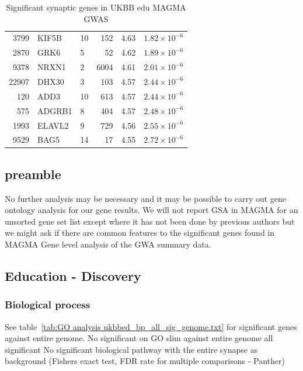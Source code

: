 \begin{table}[ht]
\begin{tabular}{rllrrr}
  3799 & KIF5B & 10 & 152 & 4.63 & $1.82 \times 10^{-6}$ \\ 
  2870 & GRK6 & 5 &  52 & 4.62 & $1.89 \times 10^{-6}$ \\ 
  9378 & NRXN1 & 2 & 6004 & 4.61 & $2.01 \times 10^{-6}$ \\ 
  22907 & DHX30 & 3 & 103 & 4.57 & $2.44 \times 10^{-6}$ \\ 
  120 & ADD3 & 10 & 613 & 4.57 & $2.44 \times 10^{-6}$ \\ 
  575 & ADGRB1 & 8 & 404 & 4.57 & $2.48 \times 10^{-6}$ \\ 
  1993 & ELAVL2 & 9 & 729 & 4.56 & $2.55 \times 10^{-6}$ \\ 
  9529 & BAG5 & 14 &  17 & 4.55 & $2.72 \times 10^{-6}$ \\ 
   \hline
\end{tabular}
\caption{Significant synaptic genes in UKBB edu  MAGMA GWAS} 
\label{tab:Significant synaptic genes in UKBB edu  MAGMA GWAS}
\end{table}




\subsection{preamble}
No further analysis may be necessary and it may be possible to carry out gene ontology analysis for our gene results. We will not report GSA in MAGMA for an unsorted gene set list except where it has not been done by previous authors but we might ask if there are common features to the significant genes found in MAGMA Gene level analysis of the GWA summary data.

\subsection{Education - Discovery}

\subsubsection{Biological process}
    See table~\ref{tab:GO analysis ukbbed_bp_all_sig_genome.txt} for significant genes against entire genome. 
    No significant on GO slim against entire genome all significant
No significant biological pathway with the entire synapse as background (Fishers exact test, FDR rate for multiple comparisons - Panther)
